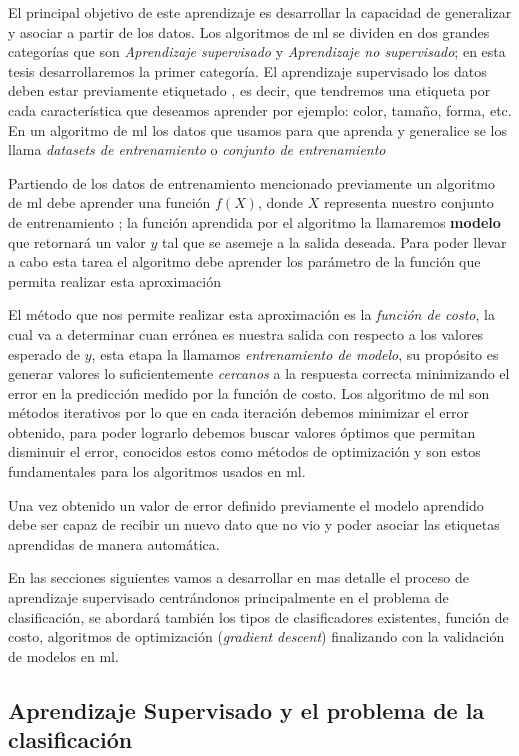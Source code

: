 El principal objetivo de este aprendizaje es desarrollar la capacidad de generalizar y asociar a partir de los datos. Los algoritmos de  \ac{ml} se dividen en dos grandes categorías que son \textit{Aprendizaje supervisado} y \textit{Aprendizaje no supervisado};  en esta tesis desarrollaremos la primer categoría.  El aprendizaje supervisado los datos deben estar previamente etiquetado , es decir, que tendremos una etiqueta por cada característica que deseamos aprender por ejemplo: color, tamaño, forma, etc. En un algoritmo de \ac{ml} los datos que usamos para que aprenda y generalice se los llama \textit{datasets de entrenamiento} o \textit{conjunto de entrenamiento}

Partiendo de los datos de entrenamiento mencionado previamente un algoritmo de \ac{ml} debe aprender una función  $ f(X)$, donde $ X$ representa nuestro conjunto de entrenamiento ; la función aprendida por el algoritmo la llamaremos \textbf{modelo}  que retornará un valor $ y$ tal que se asemeje a la salida deseada. Para poder llevar a cabo esta tarea el algoritmo debe aprender los parámetro de la función que permita realizar esta aproximación 

El método que nos permite realizar esta aproximación es la \textit{función de costo}, la cual va a  determinar cuan errónea es nuestra salida con respecto a los valores esperado de  $ y$, esta etapa la llamamos \textit{entrenamiento de modelo}, su propósito es generar valores lo suficientemente \textit{cercanos} a la respuesta correcta minimizando el error en la predicción medido por la función de costo. Los algoritmo de \ac{ml} son métodos iterativos por lo que en cada iteración debemos minimizar el error obtenido, para poder lograrlo debemos buscar valores óptimos que permitan disminuir el error, conocidos estos como {métodos de optimización}  y son estos fundamentales  para los algoritmos usados en \ac{ml}.

  Una vez obtenido un valor de error definido previamente el modelo aprendido debe ser capaz de recibir un nuevo dato que no vio y poder asociar las etiquetas aprendidas de manera automática.

En las secciones siguientes vamos a desarrollar en mas  detalle el proceso de aprendizaje supervisado centrándonos principalmente en el problema de clasificación, se abordará también los tipos de clasificadores existentes, función de costo,  algoritmos de optimización (\textit{gradient descent}) finalizando con la validación de modelos en \ac{ml}.

\subsection{Aprendizaje Supervisado y el problema de la clasificación}\label{sub:aprendizaje_supervisado}

